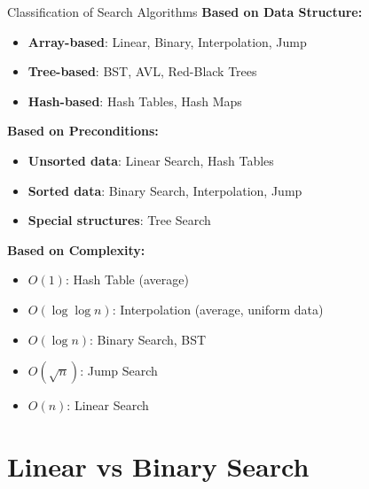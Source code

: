 \documentclass[aspectratio=169]{beamer}
\begin{document}
\begin{frame}{Classification of Search Algorithms}
  \textbf{Based on Data Structure:}
  \begin{itemize}
    \item \textbf{Array-based}: Linear, Binary, Interpolation, Jump
    \item \textbf{Tree-based}: BST, AVL, Red-Black Trees
    \item \textbf{Hash-based}: Hash Tables, Hash Maps
  \end{itemize}

  \vspace{0.3cm}
  \textbf{Based on Preconditions:}
  \begin{itemize}
    \item \textbf{Unsorted data}: Linear Search, Hash Tables
    \item \textbf{Sorted data}: Binary Search, Interpolation, Jump
    \item \textbf{Special structures}: Tree Search
  \end{itemize}

  \vspace{0.3cm}
  \textbf{Based on Complexity:}
  \begin{itemize}
    \item $O(1)$: Hash Table (average)
    \item $O(\log \log n)$: Interpolation (average, uniform data)
    \item $O(\log n)$: Binary Search, BST
    \item $O(\sqrt{n})$: Jump Search
    \item $O(n)$: Linear Search
  \end{itemize}
\end{frame}

\section{Linear vs Binary Search}
\end{document}
